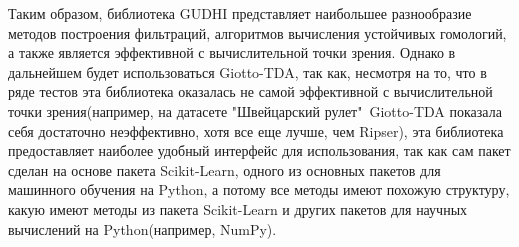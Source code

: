 Таким образом, библиотека GUDHI представляет наибольшее разнообразие методов построения фильтраций, алгоритмов вычисления устойчивых гомологий, а также является эффективной с вычислительной точки зрения. Однако в дальнейшем будет использоваться Giotto-TDA, так как, несмотря на то, что в ряде тестов эта библиотека оказалась не самой эффективной с вычислительной точки зрения(например, на датасете "Швейцарский рулет"\ Giotto-TDA показала себя достаточно неэффективно, хотя все еще лучше, чем Ripser), эта библиотека предоставляет наиболее удобный интерфейс для использования, так как сам пакет сделан на основе пакета Scikit-Learn, одного из основных пакетов для машинного обучения на Python, а потому все методы имеют похожую структуру, какую имеют методы из пакета Scikit-Learn и других пакетов для научных вычислений на Python(например, NumPy).
